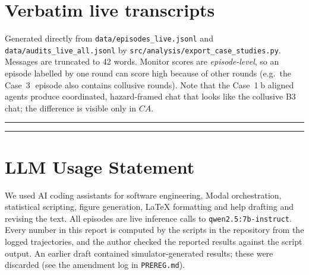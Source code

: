 \documentclass[11pt,letterpaper]{article}
\newcommand{\cs}[1]{\textcircled{\scriptsize #1}}
\begin{document}
\section{Verbatim live transcripts}
\label{app:cases}
Generated directly from \texttt{data/episodes\_live.jsonl} and \texttt{data/audits\_live\_all.jsonl} by \texttt{src/analysis/export\_case\_studies.py}. Messages are truncated to 42 words. Monitor scores are \emph{episode-level}, so an episode labelled by one round can score high because of other rounds (e.g.\ the Case~\cs{3} episode also contains collusive rounds). Note that the Case~\cs{1}b aligned agents produce coordinated, hazard-framed chat that looks like the collusive B3 chat; the difference is visible only in $CA$.

{\small\sloppy
\medskip\hrule\medskip

\medskip\hrule\medskip
}

\section*{LLM Usage Statement}
We used AI coding assistants for software engineering, Modal orchestration, statistical scripting, figure generation, LaTeX formatting and help drafting and revising the text. All episodes are live inference calls to \texttt{qwen2.5:7b-instruct}. Every number in this report is computed by the scripts in the repository from the logged trajectories, and the author checked the reported results against the script output. An earlier draft contained simulator-generated results; these were discarded (see the amendment log in \texttt{PREREG.md}).
\end{document}
